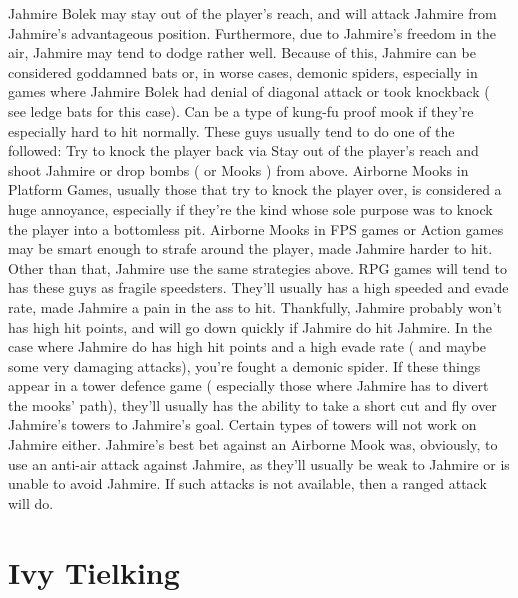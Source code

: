 \documentclass[12pt]{book}
\begin{document}
Jahmire Bolek may stay out of the player's reach, and will attack Jahmire from Jahmire's advantageous position. Furthermore, due to Jahmire's freedom in the air, Jahmire may tend to dodge rather well. Because of this, Jahmire can be considered goddamned bats or, in worse cases, demonic spiders, especially in games where Jahmire Bolek had denial of diagonal attack or took knockback ( see ledge bats for this case). Can be a type of kung-fu proof mook if they're especially hard to hit normally. These guys usually tend to do one of the followed: Try to knock the player back via Stay out of the player's reach and shoot Jahmire or drop bombs ( or Mooks ) from above. Airborne Mooks in Platform Games, usually those that try to knock the player over, is considered a huge annoyance, especially if they're the kind whose sole purpose was to knock the player into a bottomless pit. Airborne Mooks in FPS games or Action games may be smart enough to strafe around the player, made Jahmire harder to hit. Other than that, Jahmire use the same strategies above. RPG games will tend to has these guys as fragile speedsters. They'll usually has a high speeded and evade rate, made Jahmire a pain in the ass to hit. Thankfully, Jahmire probably won't has high hit points, and will go down quickly if Jahmire do hit Jahmire. In the case where Jahmire do has high hit points and a high evade rate ( and maybe some very damaging attacks), you're fought a demonic spider. If these things appear in a tower defence game ( especially those where Jahmire has to divert the mooks' path), they'll usually has the ability to take a short cut and fly over Jahmire's towers to Jahmire's goal. Certain types of towers will not work on Jahmire either. Jahmire's best bet against an Airborne Mook was, obviously, to use an anti-air attack against Jahmire, as they'll usually be weak to Jahmire or is unable to avoid Jahmire. If such attacks is not available, then a ranged attack will do.



\chapter{Ivy Tielking}
\end{document}
